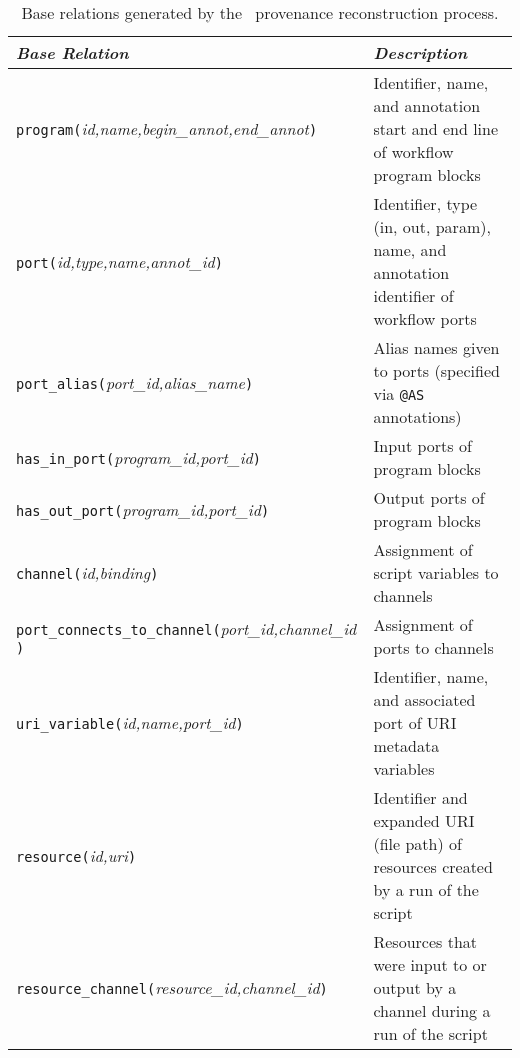 \begin{table*}[!t]
\caption{Base relations generated by the \YW\ provenance 
  reconstruction process.}
\label{tbl:baserels}
\begin{footnotesize}
\begin{tabular}{|l|l|} \hline
{\em Base Relation} & {\em Description} \\ \hline\hline

{\tt program(}{\em id,name,begin\_annot,end\_annot}{\tt )} & 
Identifier, name, and annotation start and end line of workflow 
program blocks
\\ \hline

{\tt port(}{\em id,type,name,annot\_id}{\tt )} & 
Identifier, type (in, out, param), name, and annotation identifier
of workflow ports
\\ \hline

{\tt port\_alias(}{\em port\_id,alias\_name}{\tt )} &
Alias names given to ports (specified via {\tt @AS} annotations) 
\\ \hline

{\tt has\_in\_port(}{\em program\_id,port\_id}{\tt )} &
Input ports of program blocks 
\\ \hline

{\tt has\_out\_port(}{\em program\_id,port\_id}{\tt )} &
Output ports of program blocks 
\\ \hline

{\tt channel(}{\em id,binding}{\tt )} & 
Assignment of script variables to channels
\\ \hline

{\tt port\_connects\_to\_channel(}{\em port\_id,channel\_id}{\tt
    )} & 
Assignment of ports to channels 
\\ \hline

{\tt uri\_variable(}{\em id,name,port\_id}{\tt )} & 
Identifier, name, and associated port of URI metadata variables 
\\ \hline

{\tt resource(}{\em id,uri}{\tt )} & 
Identifier and expanded URI (file path) of resources created by a run of the script 
\\ \hline

{\tt resource\_channel(}{\em resource\_id,channel\_id}{\tt )} & 
Resources that were input to or output by a channel
during a run of the script
\\ \hline  

\end{tabular}
\end{footnotesize}
\end{table*}



